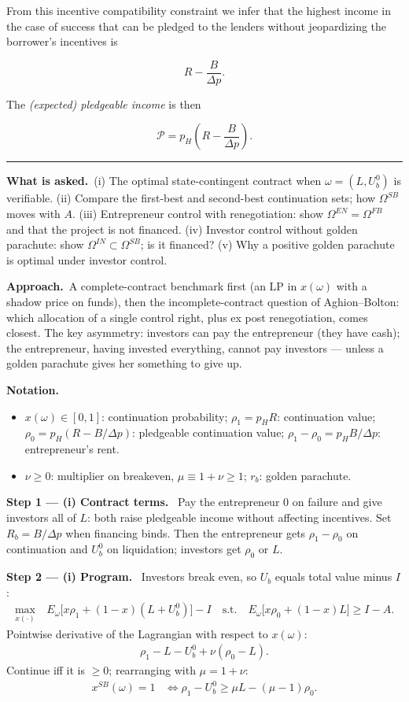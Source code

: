 \documentclass[11pt,a4paper]{article}
\newcommand{\notation}{\par\noindent\textbf{Notation.}}
\newcommand{\step}[2]{\par\medskip\noindent\textbf{Step #1 --- #2.}~}
\newcommand{\asked}{\par\medskip\noindent\textbf{What is asked.}~}
\newcommand{\approach}{\par\smallskip\noindent\textbf{Approach.}~}
\newcommand{\dpp}{\Delta p}
\newcommand{\stmtend}{\par\endgroup\nopagebreak\noindent\rule{\linewidth}{0.4pt}\par\medskip}
\begin{document}
From this incentive compatibility constraint we infer that the highest income in the case of success
that can be pledged to the lenders without jeopardizing the borrower's incentives is

\[R - \frac{B}{\Delta p}.\]

The \emph{(expected) pledgeable income} is then

\[\mathcal{P} = p_H\left(R - \frac{B}{\Delta p}\right).\]
\stmtend

\asked (i) The optimal state-contingent contract when $\omega=(L,U_b^0)$ is verifiable. (ii) Compare the first-best and second-best continuation sets; how $\Omega^{SB}$ moves with $A$. (iii) Entrepreneur control with renegotiation: show $\Omega^{EN}=\Omega^{FB}$ and that the project is not financed. (iv) Investor control without golden parachute: show $\Omega^{IN}\subset\Omega^{SB}$; is it financed? (v) Why a positive golden parachute is optimal under investor control.

\approach A complete-contract benchmark first (an LP in $x(\omega)$ with a shadow price on funds), then the incomplete-contract question of Aghion--Bolton: which allocation of a single control right, plus ex post renegotiation, comes closest. The key asymmetry: investors can pay the entrepreneur (they have cash); the entrepreneur, having invested everything, cannot pay investors --- unless a golden parachute gives her something to give up.

\notation
\begin{itemize}
  \item $x(\omega)\in[0,1]$: continuation probability; $\rho_1=p_HR$: continuation value; $\rho_0=p_H(R-B/\dpp)$: pledgeable continuation value; $\rho_1-\rho_0=p_HB/\dpp$: entrepreneur's rent.
  \item $\nu\ge0$: multiplier on breakeven, $\mu\equiv1+\nu\ge1$; $r_b$: golden parachute.
\end{itemize}

\step{1}{(i) Contract terms} Pay the entrepreneur $0$ on failure and give investors all of $L$: both raise pledgeable income without affecting incentives. Set $R_b=B/\dpp$ when financing binds. Then the entrepreneur gets $\rho_1-\rho_0$ on continuation and $U_b^0$ on liquidation; investors get $\rho_0$ or $L$.

\step{2}{(i) Program} Investors break even, so $U_b$ equals total value minus $I$:
\begin{align}
  \max_{x(\cdot)}\ & E_\omega\big[x\rho_1+(1-x)(L+U_b^0)\big]-I \quad\text{s.t.}\quad E_\omega\big[x\rho_0+(1-x)L\big]\ge I-A. \nonumber
\end{align}
Pointwise derivative of the Lagrangian with respect to $x(\omega)$:
\begin{align}
  \rho_1-L-U_b^0+\nu(\rho_0-L). \nonumber
\end{align}
Continue iff it is $\ge0$; rearranging with $\mu=1+\nu$:
\begin{align}
  x^{SB}(\omega)=1 &\iff \rho_1-U_b^0\ge\mu L-(\mu-1)\rho_0. \label{r8e15-sb}
\end{align}
\end{document}
